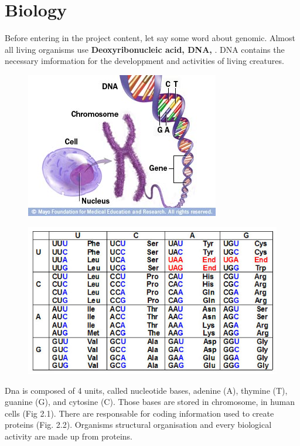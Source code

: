 \documentclass[a4paper,11pt]{report}
\begin{document}
\section{Biology}
Before entering in the project content, let say some word about genomic. Almost all living organisms use \textbf{Deoxyribonucleic acid, DNA,} \cite{ref9}. DNA contains the necessary imformation for the developpment and activities of living creatures.

\begin{figure}[H]
\centering
\begin{minipage}{.5\textwidth}
  \centering
  \includegraphics[width=.8\linewidth]{img/chromosome}
  \label{fig:test1}
\end{minipage}%
\begin{minipage}{.5\textwidth}
  \centering
  \includegraphics[width=.7\linewidth]{img/geneticcode}
  \label{fig:test2}
\end{minipage}
\end{figure}

Dna is composed of 4 units, called nucleotide bases, adenine (A), thymine (T), guanine (G), and cytosine (C). Those bases are stored in chromosome, in human cells (Fig 2.1). There are responsable for coding information used to create proteins (Fig. 2.2). Organisms structural organisation and every biological activity are made up from proteins.
\end{document}
